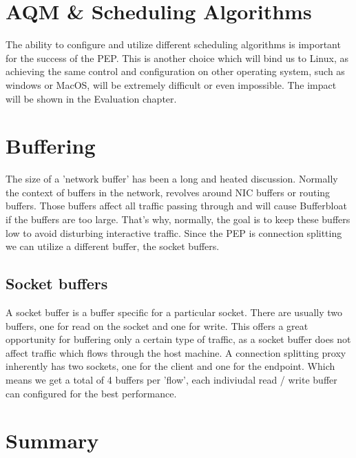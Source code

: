 \documentclass[a4paper,english, 11pt]{report}
\begin{document}
\section{AQM \& Scheduling Algorithms}
The ability to configure and utilize different scheduling algorithms is important for the success of the PEP. This is another choice which will bind us to Linux, as achieving the same control and configuration on other operating system, such as windows or MacOS, will be extremely difficult or even impossible. The impact will be shown in the Evaluation chapter.

\section{Buffering}
The size of a 'network buffer' has been a long and heated discussion. Normally the context of buffers in the network, revolves around NIC buffers or routing buffers. Those buffers affect all traffic passing through and will cause Bufferbloat if the buffers are too large. That's why, normally, the goal is to keep these buffers low to avoid disturbing interactive traffic. Since the PEP is connection splitting we can utilize a different buffer, the socket buffers.\\

\subsection{Socket buffers}
A socket buffer is a buffer specific for a particular socket. There are usually two buffers, one for read on the socket and one for write. This offers a great opportunity for buffering only a certain type of traffic, as a socket buffer does not affect traffic which flows through the host machine. A connection splitting proxy inherently has two sockets, one for the client and one for the endpoint. Which means we get a total of 4 buffers per 'flow', each indiviudal read / write buffer can configured for the best performance.

\section{Summary}
\end{document}
